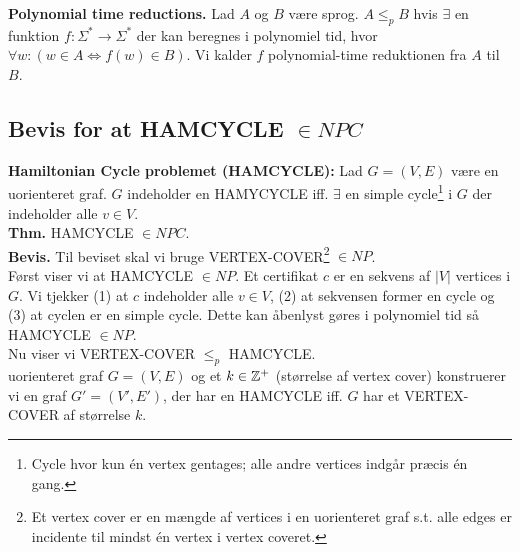 \textbf{Polynomial time reductions.} Lad $A$ og $B$ være sprog. $A \le_p B$ hvis $\exists$ en funktion $f: \Sigma^* \rightarrow \Sigma^*$ der kan beregnes i polynomiel tid, hvor $\forall w: (w \in A \Longleftrightarrow f(w) \in B)$. Vi kalder $f$ polynomial-time reduktionen fra $A$ til $B$. 

\subsection*{Bevis for at HAMCYCLE $\in NPC$}

\textbf{Hamiltonian Cycle problemet (HAMCYCLE):} Lad $G=(V,E)$ være en uorienteret graf. $G$ indeholder en HAMYCYCLE iff. $\exists$ en simple cycle\footnote{Cycle hvor kun én vertex gentages; alle andre vertices indgår præcis én gang.} i $G$ der indeholder alle $v \in V$. \\

\textbf{Thm.} HAMCYCLE $\in NPC$. \\

\textbf{Bevis.} Til beviset skal vi bruge VERTEX-COVER\footnote{Et vertex cover er en mængde af vertices i en uorienteret graf s.t. alle edges er incidente til mindst én vertex i vertex coveret.} $\in NP$. \\

Først viser vi at HAMCYCLE $\in NP$. Et certifikat $c$ er en sekvens af $|V|$ vertices i $G$. Vi tjekker (1) at $c$ indeholder alle $v \in V$, (2) at sekvensen former en cycle og (3) at cyclen er en simple cycle. Dette kan åbenlyst gøres i polynomiel tid så HAMCYCLE $\in NP$. \\

Nu viser vi VERTEX-COVER $\le_p$ HAMCYCLE. \\

uorienteret graf $G=(V,E)$ og et $k \in \mathbb{Z}^+$ (størrelse af vertex cover) konstruerer vi en graf $G'=(V',E')$, der har en HAMCYCLE iff. $G$ har et VERTEX-COVER af størrelse $k$. \\

